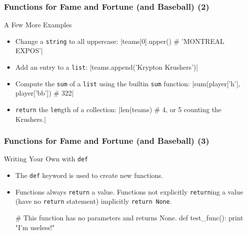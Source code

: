 \documentclass[10pt]{beamer}
\begin{document}
\begin{frame}[fragile]
  \frametitle{Functions for Fame and Fortune (and Baseball) (2)}
  \begin{block}{A Few More Examples}
    \begin{itemize}
      \item Change a \texttt{string} to all uppercase:
        |teams[0].upper() # 'MONTREAL EXPOS'|
      \item Add an entry to a \texttt{list}:
        |teams.append('Krypton Krushers')|
      \item Compute the \texttt{sum} of a \texttt{list} using the builtin \texttt{sum} function:
        |sum(player['h'], player['bb']) # 322|
      \item \texttt{return} the \texttt{len}gth of a collection:
        |len(teams) # 4, or 5 counting the Krushers.|
    \end{itemize}
  \end{block}
\end{frame}

\begin{frame}[fragile]
  \frametitle{Functions for Fame and Fortune (and Baseball) (3)}
  \begin{block}{Writing Your Own with \texttt{def}}
    \begin{itemize}
      \item The \texttt{def} keyword is used to create new functions.
      \item Functions always \texttt{return} a value. 
        Functions not explicitly \texttt{return}ing a value (have no \texttt{return} statement) implicitly \texttt{return None}.
        \begin{pythoncode}
  # This function has no parameters and returns None.
  def test_func():
    print "I'm useless!"
        \end{pythoncode}
    \end{itemize}
  \end{block}
\end{frame}
\end{document}
